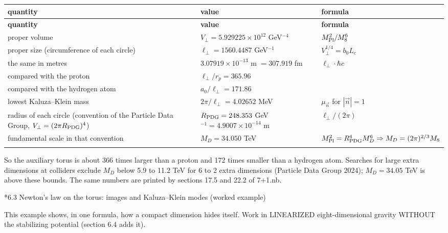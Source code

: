 \documentclass[10pt,a4paper]{article}
\makeatletter
\renewcommand\subsection{\@startsection{subsection}{2}{\z@}{-3.25ex\@plus -1ex \@minus -.2ex}{1.5ex \@plus .2ex}{\normalfont\large\bfseries\raggedright}}
\makeatother
\begin{document}
{\footnotesize
\begin{longtable}{>{\raggedright\arraybackslash}p{}>{\raggedright\arraybackslash}p{}>{\raggedright\arraybackslash}p{}}
\toprule
\textbf{quantity} & \textbf{value} & \textbf{formula} \\
\midrule\endfirsthead
\toprule
\textbf{quantity} & \textbf{value} & \textbf{formula} \\
\midrule\endhead
\endfoot
\bottomrule\endlastfoot
proper volume & $V_\perp=5.929225\times10^{12}$ GeV$^{-4}$ & $M_{\rm Pl}^2/M_8^6$ \\
proper size (circumference of each circle) & $\ell_\perp=1560.4487$ GeV$^{-1}$ & $V_\perp^{1/4}=b_0L_c$ \\
the same in metres & $3.07919\times10^{-13}$ m $=307.919$ fm & $\ell_\perp\cdot\hbar c$ \\
compared with the proton & $\ell_\perp/r_p=365.96$ &  \\
compared with the hydrogen atom & $a_0/\ell_\perp=171.86$ &  \\
lowest Kaluza–Klein mass & $2\pi/\ell_\perp=4.02652$ MeV & $\mu_{\vec n}$ for $|\vec n|=1$ \\
radius of each circle (convention of the Particle Data Group, $V_\perp=(2\pi R_{\rm PDG})^4$) & $R_{\rm PDG}=248.353$ GeV$^{-1}=4.9007\times10^{-14}$ m & $\ell_\perp/(2\pi)$ \\
fundamental scale in that convention & $M_D=34.050$ TeV & $M_{\rm Pl}^2=R_{\rm PDG}^4M_D^6\Rightarrow M_D=(2\pi)^{2/3}M_8$ \\*
\end{longtable}}
So the auxiliary torus is about 366 times larger than a proton and 172 times smaller than a hydrogen atom. Searches for large extra dimensions at colliders exclude $M_D$ below 5.9 to 11.2 TeV for 6 to 2 extra dimensions (Particle Data Group 2024); $M_D=34.05$ TeV is above these bounds. The same numbers are printed by sections 17.5 and 22.2 of 7+1.nb.

\subsection*{6.3 Newton’s law on the torus: images and Kaluza–Klein modes (worked example)}
This example shows, in one formula, how a compact dimension hides itself. Work in LINEARIZED eight-dimensional gravity WITHOUT the stabilizing potential (section 6.4 adds it).
\end{document}
